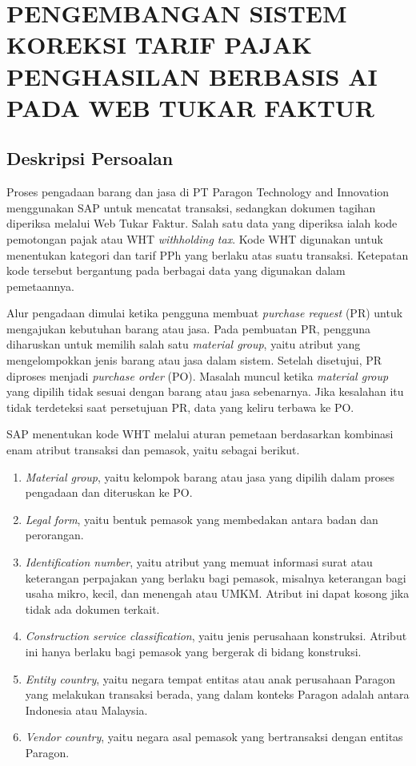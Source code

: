 \cleardoublepage
\chapter{PENGEMBANGAN SISTEM KOREKSI TARIF PAJAK PENGHASILAN BERBASIS AI PADA WEB TUKAR FAKTUR}
\label{chap:judul-pekerjaan}

\section{Deskripsi Persoalan}
\label{sec:deskripsi_persoalan}

Proses pengadaan barang dan jasa di PT Paragon Technology and Innovation menggunakan \label{abbr:SAP}SAP untuk mencatat transaksi, sedangkan dokumen tagihan diperiksa melalui Web Tukar Faktur. Salah satu data yang diperiksa ialah kode pemotongan pajak atau \label{abbr:WHT}WHT \textit{withholding tax}. Kode WHT digunakan untuk menentukan kategori dan tarif \label{abbr:PPh}PPh yang berlaku atas suatu transaksi. Ketepatan kode tersebut bergantung pada berbagai data yang digunakan dalam pemetaannya.

Alur pengadaan dimulai ketika pengguna membuat \textit{purchase request} (\label{abbr:PR}PR) untuk mengajukan kebutuhan barang atau jasa. Pada pembuatan PR, pengguna diharuskan untuk memilih salah satu \textit{material group}, yaitu atribut yang mengelompokkan jenis barang atau jasa dalam sistem. Setelah disetujui, PR diproses menjadi \textit{purchase order} (\label{abbr:PO}PO). Masalah muncul ketika \textit{material group} yang dipilih tidak sesuai dengan barang atau jasa sebenarnya. Jika kesalahan itu tidak terdeteksi saat persetujuan PR, data yang keliru terbawa ke PO.

SAP menentukan kode WHT melalui aturan pemetaan berdasarkan kombinasi enam atribut transaksi dan pemasok, yaitu sebagai berikut.
\begin{enumerate}
    \item \textit{Material group}, yaitu kelompok barang atau jasa yang dipilih dalam proses pengadaan dan diteruskan ke PO.
    \item \textit{Legal form}, yaitu bentuk pemasok yang membedakan antara badan dan perorangan.
    \item \textit{Identification number}, yaitu atribut yang memuat informasi surat atau keterangan perpajakan yang berlaku bagi pemasok, misalnya keterangan bagi usaha mikro, kecil, dan menengah atau \label{abbr:UMKM}UMKM. Atribut ini dapat kosong jika tidak ada dokumen terkait.
    \item \textit{Construction service classification}, yaitu jenis perusahaan konstruksi. Atribut ini hanya berlaku bagi pemasok yang bergerak di bidang konstruksi.
    \item \textit{Entity country}, yaitu negara tempat entitas atau anak perusahaan Paragon yang melakukan transaksi berada, yang dalam konteks Paragon adalah antara Indonesia atau Malaysia.
    \item \textit{Vendor country}, yaitu negara asal pemasok yang bertransaksi dengan entitas Paragon.
\end{enumerate}


